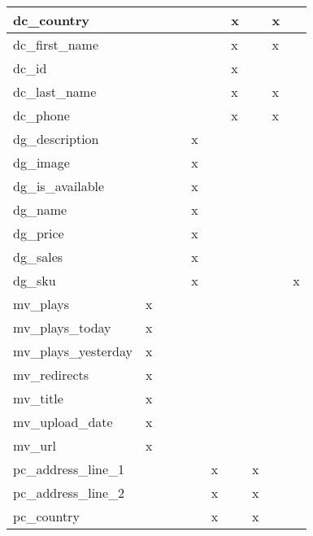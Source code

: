 \documentclass[11pt, a4paper]{report}
\begin{document}
\begin{longtable}{|l|l|l|l|l|l|l|l|l|l|}
dc\_country             &                &   &   &   &   & x &   & x &   \\ \hline
dc\_first\_name         &                &   &   &   &   & x &   & x &   \\ \hline
dc\_id                  &                &   &   &   &   & x &   &   &   \\ \hline
dc\_last\_name          &                &   &   &   &   & x &   & x &   \\ \hline
dc\_phone               &                &   &   &   &   & x &   & x &   \\ \hline
dg\_description         &                &   &   & x &   &   &   &   &   \\ \hline
dg\_image               &                &   &   & x &   &   &   &   &   \\ \hline
dg\_is\_available       &                &   &   & x &   &   &   &   &   \\ \hline
dg\_name                &                &   &   & x &   &   &   &   &   \\ \hline
dg\_price               &                &   &   & x &   &   &   &   &   \\ \hline
dg\_sales               &                &   &   & x &   &   &   &   &   \\ \hline
dg\_sku                 &                &   &   & x &   &   &   &   & x \\ \hline
mv\_plays               & x              &   &   &   &   &   &   &   &   \\ \hline
mv\_plays\_today        & x              &   &   &   &   &   &   &   &   \\ \hline
mv\_plays\_yesterday    & x              &   &   &   &   &   &   &   &   \\ \hline
mv\_redirects           & x              &   &   &   &   &   &   &   &   \\ \hline
mv\_title               & x              &   &   &   &   &   &   &   &   \\ \hline
mv\_upload\_date        & x              &   &   &   &   &   &   &   &   \\ \hline
mv\_url                 & x              &   &   &   &   &   &   &   &   \\ \hline
pc\_address\_line\_1    &                &   &   &   & x &   & x &   &   \\ \hline
pc\_address\_line\_2    &                &   &   &   & x &   & x &   &   \\ \hline
pc\_country             &                &   &   &   & x &   & x &   &   \\ \hline

\end{longtable}
\end{document}

